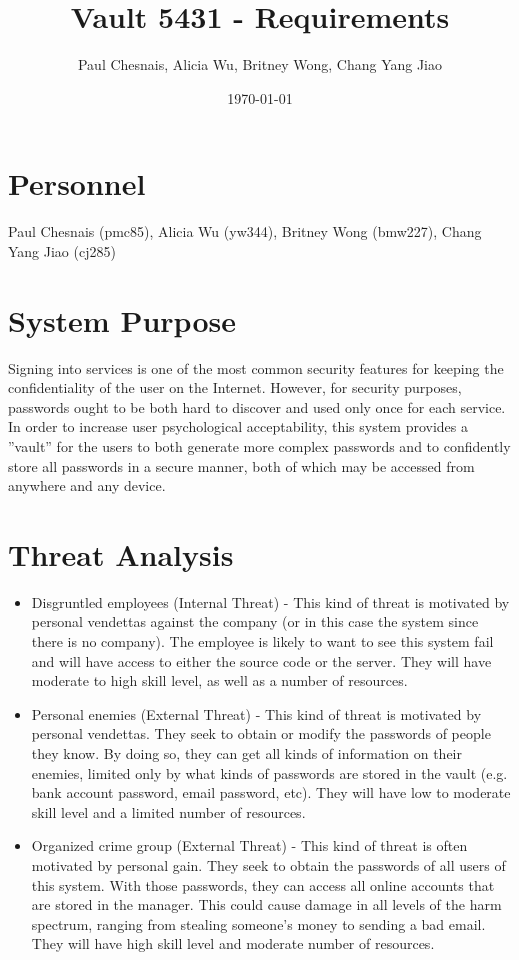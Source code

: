 \documentclass{article}
\title{Vault 5431 - Requirements}
\author{Paul Chesnais, Alicia Wu, Britney Wong, Chang Yang Jiao}
\date{\today}
\begin{document}
\maketitle
\thispagestyle{empty}

\section{Personnel}
\label{sec:personel}
Paul Chesnais (pmc85), Alicia Wu (yw344), Britney Wong (bmw227), Chang Yang Jiao (cj285)

\section{System Purpose}
\label{sec:system_purpose}

Signing into services is one of the most common security features for keeping the confidentiality of the user on the Internet. However, for security purposes, passwords ought to be both hard to discover and used only once for each service. In order to increase user psychological acceptability, this system provides a ''vault'' for the users to both generate more complex passwords and to confidently store all passwords in a secure manner, both of which may be accessed from anywhere and any device.

\section{Threat Analysis}
\label{sec:threat_analysis}

\begin{itemize}
  \item Disgruntled employees (Internal Threat) - This kind of threat is motivated by personal vendettas against the company (or in this case the system since there is no company). The employee is likely to want to see this system fail and will have access to either the source code or the server. They will have moderate to high skill level, as well as a number of resources.
  \item Personal enemies (External Threat) - This kind of threat is motivated by personal vendettas. They seek to obtain or modify the passwords of people they know. By doing so, they can get all kinds of information on their enemies, limited only by what kinds of passwords are stored in the vault (e.g. bank account password, email password, etc). They will have low to moderate skill level and a limited number of resources.
  \item Organized crime group (External Threat) - This kind of threat is often motivated by personal gain. They seek to obtain the passwords of all users of this system. With those passwords, they can access all online accounts that are stored in the manager. This could cause damage in all levels of the harm spectrum, ranging from stealing someone’s money to sending a bad email. They will have high skill level and moderate number of resources.
\end{itemize}
\end{document}
